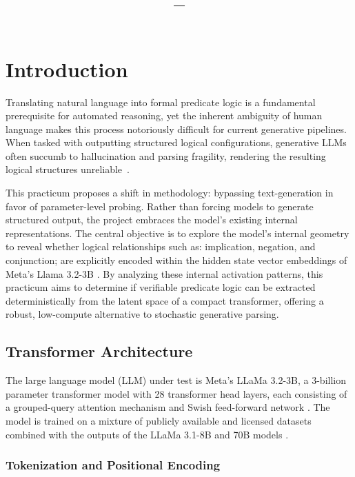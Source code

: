 \documentclass[12 pt]{article}  %
\title{\myassignment \\ \large \myclass--\mysemester \\ \myname}
\begin{document}

\tableofcontents
\listoffigures
\newpage
{}

\section{Introduction}
Translating natural language into formal predicate logic is a fundamental 
prerequisite for automated reasoning, yet the inherent ambiguity of human 
language makes this process notoriously difficult for current generative 
pipelines. When tasked with outputting structured logical configurations, 
generative LLMs often succumb to hallucination and parsing fragility, rendering 
the resulting logical structures unreliable~\cite{jin2022logicalfallacydetection, 
lalwani2025autoformalizingnaturallanguagefirstorder, lu-etal-2022-parsing,
yang2023couplinglargelanguagemodels}. 

This practicum proposes a shift in methodology: bypassing text-generation in 
favor of parameter-level probing. Rather than forcing models to generate 
structured output, the project embraces the model's existing internal representations. 
The central objective is to explore the model's internal geometry to reveal 
whether logical relationships such as: implication, negation, and 
conjunction; are explicitly encoded within the hidden state vector embeddings 
of Meta's Llama 3.2-3B \cite{alain2018understandingintermediatelayersusing, 
marks2024geometrytruthemergentlinear}. By analyzing these internal activation 
patterns, this practicum aims to determine if verifiable predicate logic can 
be extracted deterministically from the latent space of a compact transformer, 
offering a robust, low-compute alternative to stochastic generative parsing.

\subsection{Transformer Architecture}
The large language model (LLM) under test is Meta's LLaMa 3.2-3B, a 3-billion 
parameter transformer model with 28 transformer head layers, each consisting of 
a grouped-query attention mechanism and Swish feed-forward network
\cite{grattafiori2024llama3herdmodels}. The model is trained on a mixture of 
publicly available and licensed datasets combined with the outputs of the LLaMa 
3.1-8B and 70B models \cite{Meta_2024}.

\subsubsection{Tokenization and Positional Encoding}
\end{document}

